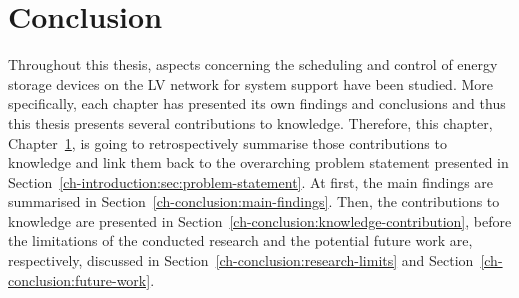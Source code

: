 \chapter{Conclusion}
\label{ch-conclusion}

Throughout this thesis, aspects concerning the scheduling and control of energy storage devices on the LV network for system support have been studied.
More specifically, each chapter has presented its own findings and conclusions and thus this thesis presents several contributions to knowledge.
Therefore, this chapter, Chapter~\ref{ch-conclusion}, is going to retrospectively summarise those contributions to knowledge and link them back to the overarching problem statement presented in Section~\ref{ch-introduction:sec:problem-statement}.
At first, the main findings are summarised in Section~\ref{ch-conclusion:main-findings}.
Then, the contributions to knowledge are presented in Section~\ref{ch-conclusion:knowledge-contribution}, before the limitations of the conducted research and the potential future work are, respectively, discussed in Section~\ref{ch-conclusion:research-limits} and Section~\ref{ch-conclusion:future-work}.









